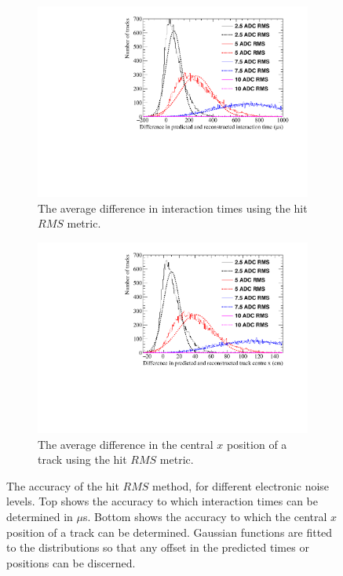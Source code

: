 \begin{figure}[h!]
  \centering
  \begin{subfigure}{0.6\textwidth}
    \centering
    \includegraphics[width=\textwidth]{Canvas_AvDiff_T_RMS_NoiseLevel}
    \caption{The average difference in interaction times using the hit $RMS$ metric.}
    \label{fig:DiffNoiseStudy_AvDiffRMS_T}
  \end{subfigure}
  \begin{subfigure}{0.6\textwidth}
    \centering
    \includegraphics[width=\textwidth]{Canvas_AvDiff_X_RMS_NoiseLevel}
    \caption{The average difference in the central $x$ position of a track using the hit $RMS$ metric.}
    \label{fig:DiffNoiseStudy_AvDiffRMS_X}
  \end{subfigure}
  \caption[Comparing the accuracy of the hit $RMS$ method, as the electronic noise changes]
          {The accuracy of the hit $RMS$ method, for different electronic noise levels. Top shows the accuracy to which interaction times can be determined in $\mu$s. Bottom shows the accuracy to which the central $x$ position of a track can be determined. Gaussian functions are fitted to the distributions so that any offset in the predicted times or positions can be discerned.}
  \label{fig:DiffNoiseStudy_AvDiff_RMS}
\end{figure}

